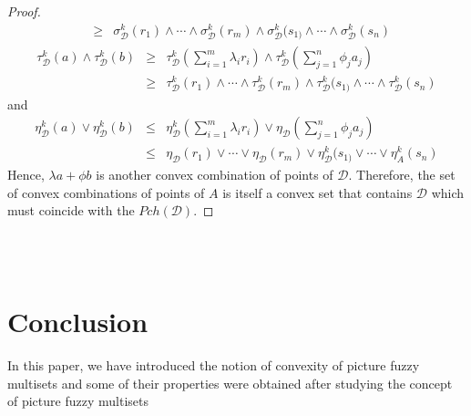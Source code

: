 \documentclass[12pt,letterpaper]{amsart}
\theoremstyle{plain}
\theoremstyle{definition}
\numberwithin{equation}{section}
\begin{document}
\begin{proof}
\begin{eqnarray*}
& \geq & \sigma^k_{\mathcal{D}}(r_1) \wedge \cdots \wedge \sigma^k_{\mathcal{D}}(r_m)\wedge \sigma^k_{\mathcal{D}}(s_{1)} \wedge \cdots \wedge \sigma^k_{\mathcal{D}}(s_n)
\end{eqnarray*} 
\begin{eqnarray*}
\tau^k_{\mathcal{D}}(a) \wedge \tau^k_{\mathcal{D}}(b) & \geq & \tau^k_{\mathcal{D}}(\sum \limits_{i=1}^{m} \lambda_{i} r_{i}) \wedge \tau^k_{\mathcal{D}}(\sum \limits_{j=1}^{n} \phi_{j} a_{j})\\
& \geq & \tau^k_{\mathcal{D}}(r_1) \wedge \cdots \wedge \tau^k_{\mathcal{D}}(r_m)\wedge \tau^k_{\mathcal{D}}(s_{1)} \wedge \cdots \wedge \tau^k_{\mathcal{D}}(s_n)
\end{eqnarray*}   
and \begin{eqnarray*}
\eta^k_{\mathcal{D}}(a) \vee \eta^k_{\mathcal{D}}(b) & \leq & \eta^k_{\mathcal{D}}(\sum \limits_{i=1}^{m} \lambda_{i} r_{i}) \vee \eta_{\mathcal{D}}(\sum \limits_{j=1}^{n} \phi_{j} a_{j})\\
& \leq & \eta_{\mathcal{D}}(r_1) \vee \cdots \vee \eta_{\mathcal{D}}(r_m)\vee \eta^k_{\mathcal{D}}(s_{1)} \vee \cdots \vee \eta^k_{A}(s_n)
\end{eqnarray*} 
Hence, $\lambda a + \phi b$ is another convex combination of points of $\mathcal{D}$. Therefore, the set of convex combinations of points of $A$ is itself a convex set that contains $\mathcal{D}$ which must coincide with the $Pch(\mathcal{D})$. 
\end{proof}


\ \\ \ \\
\section{Conclusion}
In this paper, we have introduced the notion of convexity of picture fuzzy multisets and some of their properties were obtained after studying the concept of picture fuzzy multisets
\end{document}
